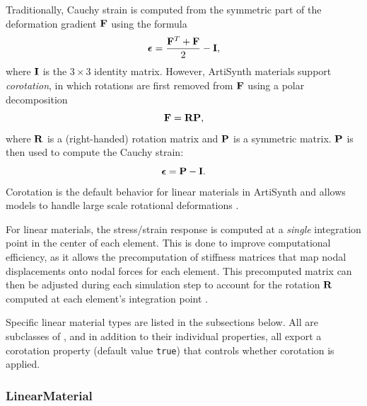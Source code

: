Traditionally, Cauchy strain is computed from the symmetric part of
the deformation gradient $\F$ using the formula
%
\begin{equation}
\Beps = \frac{\F^T + \F}{2} - \I,
\end{equation}
%
where $\I$ is the $3 \times 3$ identity matrix. However, ArtiSynth
materials support {\it corotation}, in which rotations are first
removed from $\F$ using a polar decomposition
%
\begin{equation}
\F = \R \P,
\label{polardF:eqn}
\end{equation}
%
where $\R$ is a (right-handed) rotation matrix and $\P$ is a symmetric
matrix. $\P$ is then used to compute the Cauchy strain:
%
\begin{equation}
\Beps = \P - \I.
\end{equation}
Corotation is the default behavior for linear materials in ArtiSynth
and allows models to handle large scale rotational deformations
\cite{ngan:fem:2008,muller2004interactive}.

For linear materials, the stress/strain response is computed at a {\it
single} integration point in the center of each element. This is done
to improve computational efficiency, as it allows the precomputation
of stiffness matrices that map nodal displacements onto nodal forces
for each element. This precomputed matrix can then be adjusted during
each simulation step to account for the rotation $\R$ computed at each
element's integration
point \cite{ngan:fem:2008,muller2004interactive}.

Specific linear material types are listed in the subsections
below. All are subclasses of
,
and in addition to their individual properties, all export a {\sf
corotation} property (default value {\tt true}) that controls whether
corotation is applied.

\subsubsection{LinearMaterial}

